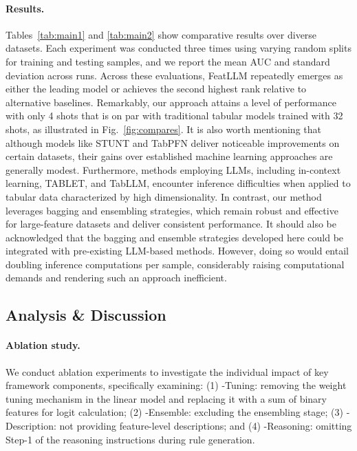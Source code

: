 \vspace*{-0.12in}
\paragraph{Results.}
Tables~\ref{tab:main1} and \ref{tab:main2} show comparative results over diverse datasets. Each experiment was conducted three times using varying random splits for training and testing samples, and we report the mean AUC and standard deviation across runs. Across these evaluations, \textsf{FeatLLM} repeatedly emerges as either the leading model or achieves the second highest rank relative to alternative baselines. Remarkably, our approach attains a level of performance with only 4 shots that is on par with traditional tabular models trained with 32 shots, as illustrated in Fig.~\ref{fig:compares}. It is also worth mentioning that although models like STUNT and TabPFN deliver noticeable improvements on certain datasets, their gains over established machine learning approaches are generally modest. Furthermore, methods employing LLMs, including in-context learning, TABLET, and TabLLM, encounter inference difficulties when applied to tabular data characterized by high dimensionality. In contrast, our method leverages bagging and ensembling strategies, which remain robust and effective for large-feature datasets and deliver consistent performance. It should also be acknowledged that the bagging and ensemble strategies developed here could be integrated with pre-existing LLM-based methods. However, doing so would entail doubling inference computations per sample, considerably raising computational demands and rendering such an approach inefficient.

\subsection{Analysis \& Discussion}
\label{sec:analysis}
\paragraph{Ablation study.} We conduct ablation experiments to investigate the individual impact of key framework components, specifically examining: (1) \textsf{-Tuning}: removing the weight tuning mechanism in the linear model and replacing it with a sum of binary features for logit calculation; (2) \textsf{-Ensemble}: excluding the ensembling stage; (3) \textsf{-Description}: not providing feature-level descriptions; and (4) \textsf{-Reasoning}: omitting Step-1 of the reasoning instructions during rule generation.

